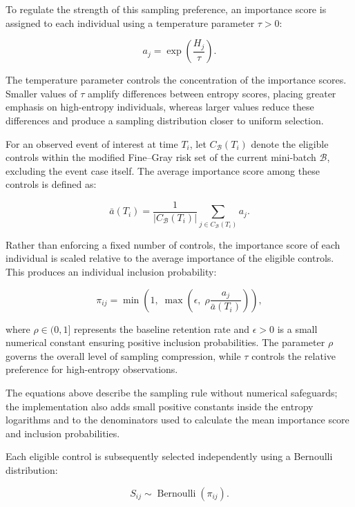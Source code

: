 \documentclass[a4paper,twoside,12pt]{report}
\begin{document}
To regulate the strength of this sampling preference, an importance score is assigned to each individual using a temperature parameter $\tau>0$:

\begin{equation}
a_j =
\exp\left(\frac{H_j}{\tau}\right).
\end{equation}

The temperature parameter controls the concentration of the importance scores. Smaller values of $\tau$ amplify differences between entropy scores, placing greater emphasis on high-entropy individuals, whereas larger values reduce these differences and produce a sampling distribution closer to uniform selection.

For an observed event of interest at time $T_i$, let $C_{\mathcal{B}}(T_i)$ denote the eligible controls within the modified Fine--Gray risk set of the current mini-batch $\mathcal{B}$, excluding the event case itself. The average importance score among these controls is defined as:

\begin{equation}
\bar{a}(T_i) =
\frac{1}{|C_{\mathcal{B}}(T_i)|}
\sum_{j\in C_{\mathcal{B}}(T_i)} a_j.
\end{equation}

Rather than enforcing a fixed number of controls, the importance score of each individual is scaled relative to the average importance of the eligible controls. This produces an individual inclusion probability:

\begin{equation}
\pi_{ij} =
\min\left(
1,\;
\max\left(
\epsilon,\;
\rho
\frac{a_j}{\bar{a}(T_i)}
\right)
\right),
\end{equation}

where $\rho\in(0,1]$ represents the baseline retention rate and $\epsilon>0$ is a small numerical constant ensuring positive inclusion probabilities. The parameter $\rho$ governs the overall level of sampling compression, while $\tau$ controls the relative preference for high-entropy observations.

The equations above describe the sampling rule without numerical safeguards; the implementation also adds small positive constants inside the entropy logarithms and to the denominators used to calculate the mean importance score and inclusion probabilities.

Each eligible control is subsequently selected independently using a Bernoulli distribution:

\begin{equation}
S_{ij} \sim \operatorname{Bernoulli}(\pi_{ij}).
\end{equation}
\end{document}
